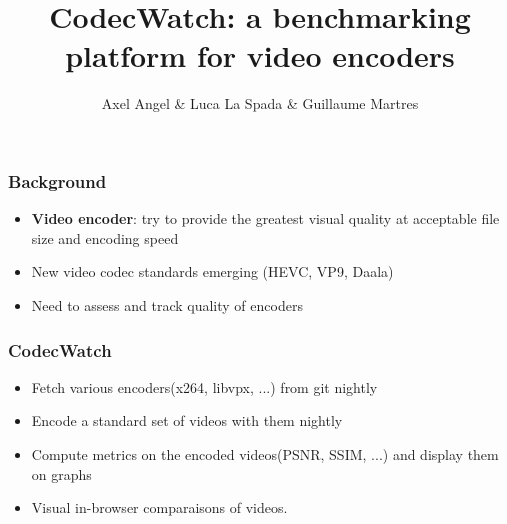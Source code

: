 \documentclass{beamer}
\title{CodecWatch: a benchmarking platform for video encoders}
\author{Axel Angel \& Luca La Spada \& Guillaume Martres}
\begin{document}
\frame{\titlepage}

\begin{frame}
  \frametitle{Background}
  \begin{itemize}
    \item \textbf{Video encoder}: try to provide the greatest visual quality at acceptable
      file size and encoding speed
    \item New video codec standards emerging (HEVC, VP9, Daala)
    \item Need to assess and track quality of encoders
  \end{itemize}
\end{frame}

\begin{frame}
  \frametitle{CodecWatch}
  \begin{itemize}
    \item Fetch various encoders(x264, libvpx, ...) from git nightly
    \item Encode a standard set of videos with them nightly
    \item Compute metrics on the encoded videos(PSNR, SSIM, ...) and display
      them on graphs
    \item Visual in-browser comparaisons of videos.
  \end{itemize}
\end{frame}
\end{document}
